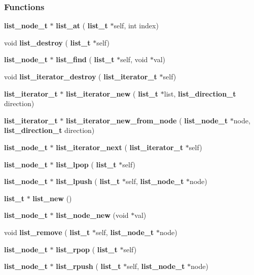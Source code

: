 \subsubsection*{Functions}
\begin{DoxyCompactItemize}
\item 
\textbf{ list\+\_\+node\+\_\+t} $\ast$ \textbf{ list\+\_\+at} (\textbf{ list\+\_\+t} $\ast$self, int index)
\item 
void \textbf{ list\+\_\+destroy} (\textbf{ list\+\_\+t} $\ast$self)
\item 
\textbf{ list\+\_\+node\+\_\+t} $\ast$ \textbf{ list\+\_\+find} (\textbf{ list\+\_\+t} $\ast$self, void $\ast$val)
\item 
void \textbf{ list\+\_\+iterator\+\_\+destroy} (\textbf{ list\+\_\+iterator\+\_\+t} $\ast$self)
\item 
\textbf{ list\+\_\+iterator\+\_\+t} $\ast$ \textbf{ list\+\_\+iterator\+\_\+new} (\textbf{ list\+\_\+t} $\ast$list, \textbf{ list\+\_\+direction\+\_\+t} direction)
\item 
\textbf{ list\+\_\+iterator\+\_\+t} $\ast$ \textbf{ list\+\_\+iterator\+\_\+new\+\_\+from\+\_\+node} (\textbf{ list\+\_\+node\+\_\+t} $\ast$node, \textbf{ list\+\_\+direction\+\_\+t} direction)
\item 
\textbf{ list\+\_\+node\+\_\+t} $\ast$ \textbf{ list\+\_\+iterator\+\_\+next} (\textbf{ list\+\_\+iterator\+\_\+t} $\ast$self)
\item 
\textbf{ list\+\_\+node\+\_\+t} $\ast$ \textbf{ list\+\_\+lpop} (\textbf{ list\+\_\+t} $\ast$self)
\item 
\textbf{ list\+\_\+node\+\_\+t} $\ast$ \textbf{ list\+\_\+lpush} (\textbf{ list\+\_\+t} $\ast$self, \textbf{ list\+\_\+node\+\_\+t} $\ast$node)
\item 
\textbf{ list\+\_\+t} $\ast$ \textbf{ list\+\_\+new} ()
\item 
\textbf{ list\+\_\+node\+\_\+t} $\ast$ \textbf{ list\+\_\+node\+\_\+new} (void $\ast$val)
\item 
void \textbf{ list\+\_\+remove} (\textbf{ list\+\_\+t} $\ast$self, \textbf{ list\+\_\+node\+\_\+t} $\ast$node)
\item 
\textbf{ list\+\_\+node\+\_\+t} $\ast$ \textbf{ list\+\_\+rpop} (\textbf{ list\+\_\+t} $\ast$self)
\item 
\textbf{ list\+\_\+node\+\_\+t} $\ast$ \textbf{ list\+\_\+rpush} (\textbf{ list\+\_\+t} $\ast$self, \textbf{ list\+\_\+node\+\_\+t} $\ast$node)
\end{DoxyCompactItemize}



